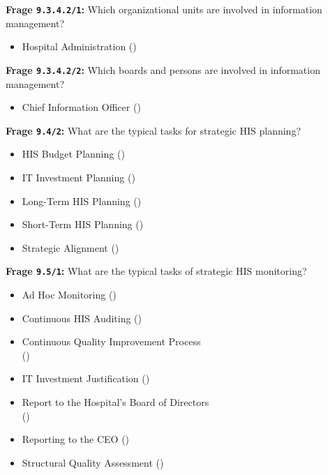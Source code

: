 \textbf{Frage \texttt{9.3.4.2/1}:} Which organizational units are involved in information management?

\begin{itemize}
  \item Hospital Administration ()
\end{itemize}

\textbf{Frage \texttt{9.3.4.2/2}:} Which boards and persons are involved in information management?

\begin{itemize}
  \item Chief Information Officer ()
\end{itemize}

\textbf{Frage \texttt{9.4/2}:} What are the typical tasks for strategic HIS planning?

\begin{itemize}
  \item HIS Budget Planning ()
  \item IT Investment Planning ()
  \item Long-Term HIS Planning ()
  \item Short-Term HIS Planning ()
  \item Strategic Alignment ()
\end{itemize}

\textbf{Frage \texttt{9.5/1}:} What are the typical tasks of strategic HIS monitoring?

\begin{itemize}
  \item Ad Hoc Monitoring ()
  \item Continuous HIS Auditing ()
  \item Continuous Quality Improvement Process \\
  ()
  \item IT Investment Justification ()
  \item Report to the Hospital’s Board of Directors \\
  ()
  \item Reporting to the CEO ()
  \item Structural Quality Assessment ()
\end{itemize}

